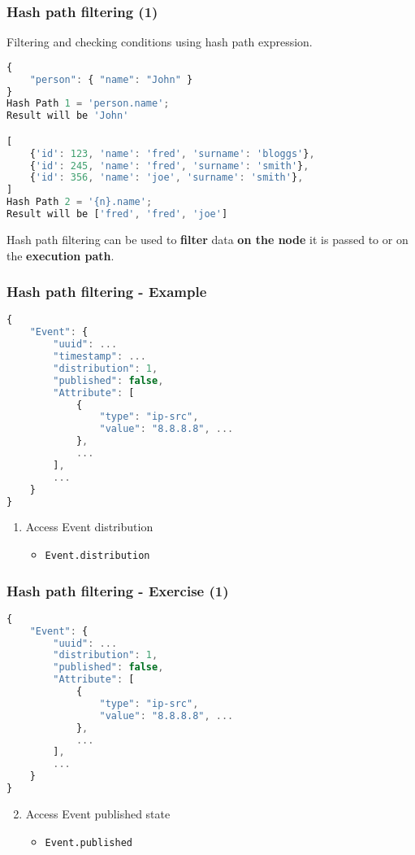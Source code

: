 \begin{frame}[fragile]
    \frametitle{Hash path filtering (1)}
    Filtering and checking conditions using hash path expression.
    \begin{lstlisting}[language=javascript,firstnumber=1]
{
    "person": { "name": "John" }
}
Hash Path 1 = 'person.name';
Result will be 'John'

[
    {'id': 123, 'name': 'fred', 'surname': 'bloggs'},
    {'id': 245, 'name': 'fred', 'surname': 'smith'},
    {'id': 356, 'name': 'joe', 'surname': 'smith'},
]
Hash Path 2 = '{n}.name';
Result will be ['fred', 'fred', 'joe']
    \end{lstlisting}

    \vspace{1em}
    Hash path filtering can be used to \textbf{filter} data \textbf{on the node} it is passed to or on the \textbf{execution path}.
\end{frame}

\begin{frame}[fragile]
    \frametitle{Hash path filtering - Example}

\begin{lstlisting}[language=javascript,firstnumber=1]
{
    "Event": {
        "uuid": ...
        "timestamp": ...
        "distribution": 1,
        "published": false,
        "Attribute": [
            {
                "type": "ip-src",
                "value": "8.8.8.8", ...
            },
            ...
        ],
        ...
    }
}
\end{lstlisting}
    \begin{enumerate}
        \item Access Event distribution
        \begin{itemize}
            \item \texttt{Event.distribution}
        \end{itemize}
    \end{enumerate}
\end{frame}

\begin{frame}[fragile]
    \frametitle{Hash path filtering - Exercise (1)}

\begin{lstlisting}[language=javascript,firstnumber=1]
{
    "Event": {
        "uuid": ...
        "distribution": 1,
        "published": false,
        "Attribute": [
            {
                "type": "ip-src",
                "value": "8.8.8.8", ...
            },
            ...
        ],
        ...
    }
}
\end{lstlisting}
    \begin{enumerate}
        \setcounter{enumi}{1}
        \item Access Event published state
        \pause
        \begin{itemize}
            \item \texttt{Event.published}
        \end{itemize}
    \end{enumerate}
\end{frame}

